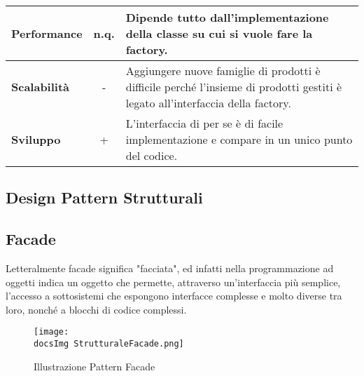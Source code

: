{{{\begin{itemize}
{\begin{tabular}{|l|c|l|}
						\hline
						\textbf{Performance} & n.q. & Dipende tutto dall'implementazione della classe su cui si vuole fare la factory. \\
						\hline
						\textbf{Scalabilità} & - & Aggiungere nuove famiglie di prodotti è difficile perché l’insieme di prodotti gestiti è legato all'interfaccia della factory. \\
						\hline
						\textbf{Sviluppo} & + & L'interfaccia di per se è di facile implementazione e compare in un unico punto del codice. \\
						\hline
					\end{tabular}
				}
			\end{itemize}
		}	
	}
	\subsection{Design Pattern Strutturali}{
		\subsection{Facade}{
			Letteralmente facade significa "facciata", ed infatti nella programmazione ad oggetti indica un oggetto che permette, attraverso un'interfaccia più semplice, l'accesso a sottosistemi che espongono interfacce complesse e molto diverse tra loro, nonché a blocchi di codice complessi.
			
			\begin{figure}[ht]
				\centering
				\texttt{[image: \\docsImg StrutturaleFacade.png]}
				\caption{Illustrazione Pattern Facade}
				\label{Illustrazione Pattern Facade}
			\end{figure}
			
}}}
